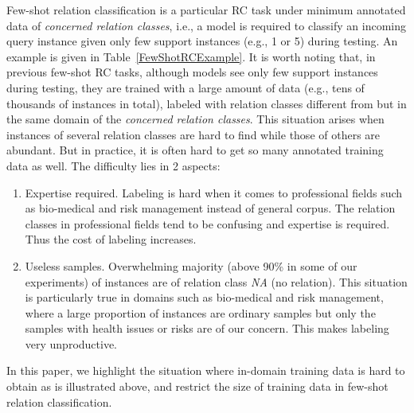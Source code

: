 Few-shot relation classification is a particular RC task under minimum annotated data of 
{\em concerned relation classes}, i.e., a model is required to classify an incoming query 
instance given only few support instances (e.g., 1 or 5) during testing. 
An example is given in Table~\ref{FewShotRCExample}.
It is worth noting that, in previous few-shot RC tasks, although models see only few support instances during testing, they are trained with a large amount of data (e.g., tens of thousands of instances in total), labeled with relation classes different from but in the same domain of the {\em concerned
relation classes}.
This situation arises when instances of several relation classes are hard to find while 
those of others are abundant.
But in practice, it is often hard to get so many annotated training data as well. 
The difficulty %
lies in 2 aspects:
\begin{enumerate}
	\item Expertise required. Labeling is hard when it comes to professional fields such as bio-medical and risk management instead of general corpus. The relation classes in professional fields tend to be confusing and expertise is required.
	Thus the cost of labeling increases.
	\item Useless samples. Overwhelming majority (above 90\% in some of our experiments) 
of instances are of relation class \emph{NA} (no relation). 
This situation is particularly true in domains such as bio-medical and risk management, 
where a large proportion of instances are %
ordinary samples
but only the samples with health issues 
or risks are of our concern. This makes labeling very unproductive. 
\end{enumerate}
In this paper, we highlight the situation where in-domain training data is hard to obtain as is illustrated above, and restrict the size of training data in few-shot relation classification.

